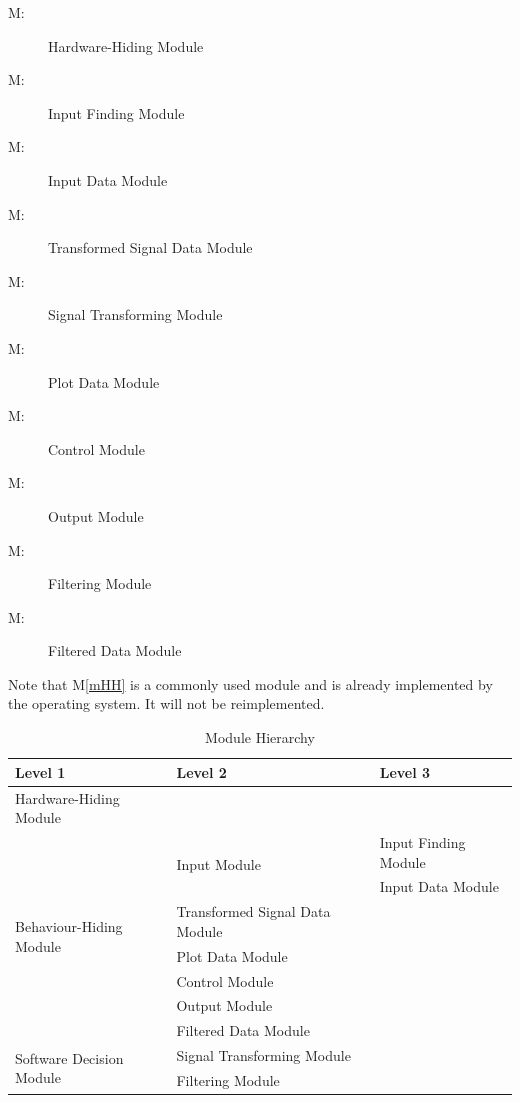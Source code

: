 \documentclass[12pt]{article}
\newcounter{mnum}
\newcommand{\mthemnum}{M\themnum}
\newcommand{\mref}[1]{M\ref{#1}}
\begin{document}
\begin{description}
\item [ \mthemnum \label{mHH}:] Hardware-Hiding Module
\item [ \mthemnum \label{mInput}:] Input Finding Module
\item [ \mthemnum \label{mInputData}:] Input Data Module
\item [ \mthemnum \label{mTransformInfo}:] Transformed 
Signal Data Module
\item [ \mthemnum \label{mTransform}:] Signal 
Transforming Module
\item [ \mthemnum \label{mPlotInfo}:] Plot Data Module
\item [ \mthemnum \label{mControl}:] Control Module
\item [ \mthemnum \label{mOutput}:] Output Module
\item [ \mthemnum \label{mFilter}:] Filtering Module
\item [ \mthemnum \label{mFilterInfo}:] Filtered Data
 Module
\end{description}

Note that \mref{mHH} is a commonly used module and is already implemented by the 
operating
system.  It will not be reimplemented.

\begin{table}[h!]
\centering
\caption{Module Hierarchy}
\begin{tabular}{p{} p{} p{}}
\toprule
\textbf{Level 1} & \textbf{Level 2} & \textbf{Level 3}\\
\midrule

{Hardware-Hiding Module} & ~ \\
\midrule
\multirow{7}{0.3\textwidth}{Behaviour-Hiding Module}
& \multirow{2}{0.3\textwidth}{Input Module} 
& Input Finding Module\\
& & Input Data Module\\  
& Transformed Signal Data Module\\ 
& Plot Data Module\\ 
& Control Module\\ 
& Output Module\\ 
& Filtered Data Module\\
\midrule
\multirow{3}{0.3\textwidth}{Software Decision Module}
&Signal Transforming Module\\ 
& Filtering Module\\
\bottomrule
\end{tabular}
\label{TblMH}
\end{table}
\end{document}
